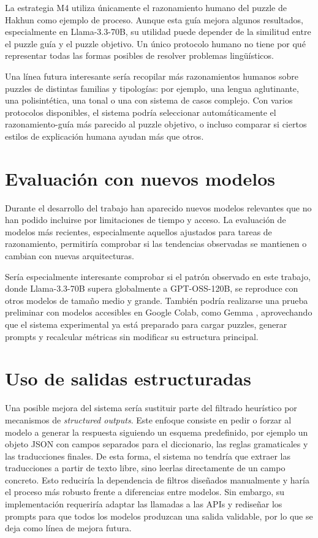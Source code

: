 La estrategia M4 utiliza únicamente el razonamiento humano del puzzle de Hakhun como ejemplo de proceso. Aunque esta guía mejora algunos resultados, especialmente en Llama-3.3-70B, su utilidad puede depender de la similitud entre el puzzle guía y el puzzle objetivo. Un único protocolo humano no tiene por qué representar todas las formas posibles de resolver problemas lingüísticos.

Una línea futura interesante sería recopilar más razonamientos humanos sobre puzzles de distintas familias y tipologías: por ejemplo, una lengua aglutinante, una polisintética, una tonal o una con sistema de casos complejo. Con varios protocolos disponibles, el sistema podría seleccionar automáticamente el razonamiento-guía más parecido al puzzle objetivo, o incluso comparar si ciertos estilos de explicación humana ayudan más que otros.

\section{Evaluación con nuevos modelos}
\label{sec:futuro_modelos}

Durante el desarrollo del trabajo han aparecido nuevos modelos relevantes que no han podido incluirse por limitaciones de tiempo y acceso. La evaluación de modelos más recientes, especialmente aquellos ajustados para tareas de razonamiento, permitiría comprobar si las tendencias observadas se mantienen o cambian con nuevas arquitecturas.

Sería especialmente interesante comprobar si el patrón observado en este trabajo, donde Llama-3.3-70B supera globalmente a GPT-OSS-120B, se reproduce con otros modelos de tamaño medio y grande. También podría realizarse una prueba preliminar con modelos accesibles en Google Colab, como Gemma \citep{gemma2024}, aprovechando que el sistema experimental ya está preparado para cargar puzzles, generar prompts y recalcular métricas sin modificar su estructura principal.

\section{Uso de salidas estructuradas}
\label{sec:salidas_estructuradas}

Una posible mejora del sistema sería sustituir parte del filtrado heurístico por mecanismos de \textit{structured outputs}. Este enfoque consiste en pedir o forzar al modelo a generar la respuesta siguiendo un esquema predefinido, por ejemplo un objeto JSON con campos separados para el diccionario, las reglas gramaticales y las traducciones finales. De esta forma, el sistema no tendría que extraer las traducciones a partir de texto libre, sino leerlas directamente de un campo concreto. Esto reduciría la dependencia de filtros diseñados manualmente y haría el proceso más robusto frente a diferencias entre modelos. Sin embargo, su implementación requeriría adaptar las llamadas a las APIs y rediseñar los prompts para que todos los modelos produzcan una salida validable, por lo que se deja como línea de mejora futura.